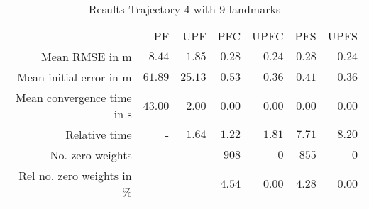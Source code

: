 \begin{table}
\centering
\begin{tabular}{rrrrrrr}
 & PF & UPF & PFC & UPFC & PFS & UPFS \\
Mean RMSE in m & $8.44$ & $1.85$ & $0.28$ & $0.24$ & $0.28$ & $0.24$ \\
Mean initial error in m & $61.89$ & $25.13$ & $0.53$ & $0.36$ & $0.41$ & $0.36$ \\
Mean convergence time in s & $43.00$ & $2.00$ & $0.00$ & $0.00$ & $0.00$ & $0.00$ \\
Relative time & - & $1.64$ & $1.22$ & $1.81$ & $7.71$ & $8.20$ \\
No. zero weights & - & - & $908$ & $0$ & $855$ & $0$ \\
Rel no. zero weights in \% & - & - & $4.54$ & $0.00$ & $4.28$ & $0.00$ \\
\end{tabular}
\caption{Results Trajectory 4 with 9 landmarks}
\label{table:landmark_positions_4}
\end{table}
